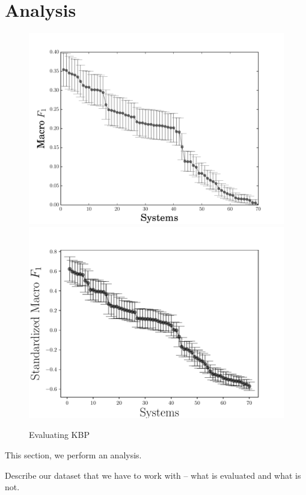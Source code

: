 \section{Analysis}
\label{sec:analysis}

\begin{figure}
  \includegraphics[width=\columnwidth]{figures/experiment1}
  \includegraphics[width=\columnwidth]{figures/experiment3}
  \caption{Evaluating KBP}
\end{figure}

This section, we perform an analysis.

Describe our dataset that we have to work with -- what is evaluated and what is not.

